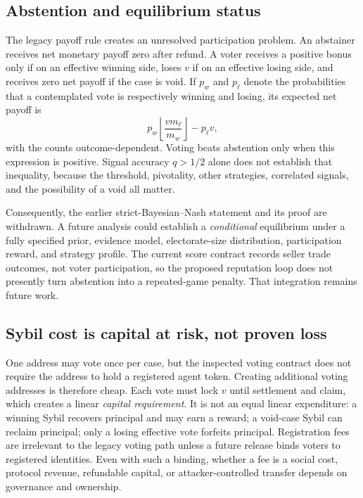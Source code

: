 \subsection{Abstention and equilibrium status}
\label{sec:abstention}

The legacy payoff rule creates an unresolved participation problem. An abstainer receives net
monetary payoff zero after refund. A voter receives a positive bonus only if on an effective winning
side, loses $v$ if on an effective losing side, and receives zero net payoff if the case is void. If
$p_w$ and $p_\ell$ denote the probabilities that a contemplated vote is respectively winning and
losing, its expected net payoff is
\[
  p_w\left\lfloor\frac{v m_\ell}{m_w}\right\rfloor-p_\ell v,
\]
with the counts outcome-dependent. Voting beats abstention only when this expression is positive.
Signal accuracy $q>1/2$ alone does not establish that inequality, because the threshold, pivotality,
other strategies, correlated signals, and the possibility of a void all matter.

Consequently, the earlier strict-Bayesian--Nash statement and its proof are withdrawn. A future
analysis could establish a \emph{conditional} equilibrium under a fully specified prior, evidence
model, electorate-size distribution, participation reward, and strategy profile. The current score
contract records seller trade outcomes, not voter participation, so the proposed reputation loop
does not presently turn abstention into a repeated-game penalty. That integration remains future
work.

\subsection{Sybil cost is capital at risk, not proven loss}
\label{sec:sybil}

One address may vote once per case, but the inspected voting contract does not require the address to
hold a registered agent token. Creating additional voting addresses is therefore cheap. Each vote
must lock $v$ until settlement and claim, which creates a linear \emph{capital requirement}. It is
not an equal linear expenditure: a winning Sybil recovers principal and may earn a reward; a void-case
Sybil can reclaim principal; only a losing effective vote forfeits principal. Registration fees are
irrelevant to the legacy voting path unless a future release binds voters to registered identities.
Even with such a binding, whether a fee is a social cost, protocol revenue, refundable capital, or
attacker-controlled transfer depends on governance and ownership.

